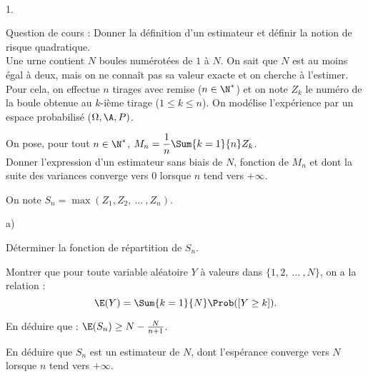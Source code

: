 \documentclass[11pt]{article}%
\begin{document}
\newpage


\begin{exerciceAP}~
  \begin{noliste}{1.}
    \setlength{\itemsep}{2mm}
  \item Question de cours : Donner la définition d'un estimateur et
    définir la notion de risque quadratique.\\[.2cm]
    Une urne contient $N$ boules numérotées de $1$ à $N$. On sait que
    $N$ est au moins égal à deux, mais on ne connaît pas sa valeur
    exacte et on cherche à l'estimer. Pour cela, on effectue $n$ tirages
    avec remise ($n \in \N^*$) et on note $Z_k$ le numéro de la
    boule obtenue au $k$-ième tirage ($1 \leq k \leq n$). On modélise
    l'expérience par un espace probabilisé ($\Omega , \A , P)$.
  \item On pose, pour tout $n \in \N^*$, $M_n = \dfrac{1}{n}
    \Sum{k=1}{n} Z_k$. \\
    Donner l'expression d'un estimateur sans biais de $N$, fonction de
    $M_n$ et dont la suite des variances converge vers 0 lorsque $n$
    tend vers $+\infty$.
  \item On note $S_n = \max ( Z_1 , Z_2 ,\ \dots\ , Z_n)$.
    \begin{noliste}{a)}
    \setlength{\itemsep}{2mm}
    \item Déterminer la fonction de répartition de $S_n$.
    \item Montrer que pour toute variable aléatoire $Y$ à valeurs dans
      $\{ 1 , 2,\ \dots\ , N \}$, on a la relation :
      \[
      \E(Y) = \Sum{k=1}{N} \Prob( [ Y \geq k ]). 
      \]
    \item En déduire que : $\E( S_n) \geq N - \frac{N}{n+1}$.
    \item En déduire que $S_n$ est un estimateur de $N$, dont
      l'espérance converge vers $N$ lorsque $n$ tend vers $+\infty$.
    \end{noliste}
  \end{noliste}
\end{exerciceAP}
\end{document}

